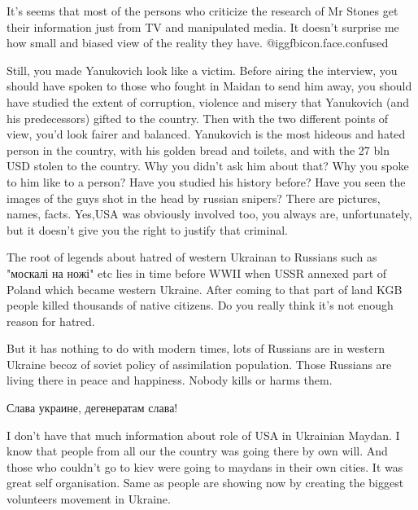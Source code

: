 \begin{itemize}

It's seems that most of the persons who criticize the research of Mr Stones get
their information just from TV and manipulated media. It doesn't surprise me
how small and biased view of the reality they have.  @igg{fbicon.face.confused} 



Still, you made Yanukovich look like a victim. Before airing the interview, you
should have spoken to those who fought in Maidan to send him away, you should
have studied the extent of corruption, violence and misery that Yanukovich (and
his predecessors) gifted to the country. Then with the two different points of
view, you'd look fairer and balanced. Yanukovich is the most hideous and hated
person in the country, with his golden bread and toilets, and with the 27 bln
USD stolen to the country. Why you didn't ask him about that? Why you spoke to
him like to a person? Have you studied his history before? Have you seen the
images of the guys shot in the head by russian snipers? There are pictures,
names, facts. Yes,USA was obviously involved too, you always are,
unfortunately, but it doesn't give you the right to justify that criminal.



The root of legends about hatred of western Ukrainan to Russians such as
"москалі на ножі" etc lies in time before WWII when USSR annexed part of Poland
which became western Ukraine. After coming to that part of land KGB people
killed thousands of native citizens. Do you really think it's not enough reason
for hatred.

But it has nothing to do with modern times, lots of Russians are in western
Ukraine becoz of soviet policy of assimilation population. Those Russians are
living there in peace and happiness. Nobody kills or harms them.

\begin{itemize} %
Слава украине, дегенератам слава!
\end{itemize} %


I don't have that much information about role of USA in Ukrainian Maydan. I
know that people from all our the country was going there by own will. And
those who couldn't go to kiev were going to maydans in their own cities. It was
great self organisation. Same as people are showing now by creating the biggest
volunteers movement in Ukraine.


\end{itemize}
